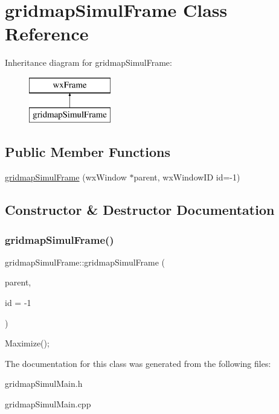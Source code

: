 \hypertarget{classgridmapSimulFrame}{}\section{gridmap\+Simul\+Frame Class Reference}
\label{classgridmapSimulFrame}
Inheritance diagram for gridmap\+Simul\+Frame\+:\begin{figure}[H]
\begin{center}
\leavevmode
\includegraphics[height=2.000000cm]{classgridmapSimulFrame}
\end{center}
\end{figure}
\subsection*{Public Member Functions}
\begin{DoxyCompactItemize}
\item 
\mbox{\hyperlink{classgridmapSimulFrame_ac1ac89ea6a9a31594031b1555124e9de}{gridmap\+Simul\+Frame}} (wx\+Window $\ast$parent, wx\+Window\+ID id=-\/1)
\end{DoxyCompactItemize}


\subsection{Constructor \& Destructor Documentation}
\mbox{\label{classgridmapSimulFrame_ac1ac89ea6a9a31594031b1555124e9de}} 
\subsubsection{\texorpdfstring{gridmap\+Simul\+Frame()}{gridmapSimulFrame()}}
{\footnotesize\ttfamily gridmap\+Simul\+Frame\+::gridmap\+Simul\+Frame (\begin{DoxyParamCaption}\item[{wx\+Window $\ast$}]{parent,  }\item[{wx\+Window\+ID}]{id = {\ttfamily -\/1} }\end{DoxyParamCaption})}

Maximize(); 

The documentation for this class was generated from the following files\+:\begin{DoxyCompactItemize}
\item 
gridmap\+Simul\+Main.\+h\item 
gridmap\+Simul\+Main.\+cpp\end{DoxyCompactItemize}
